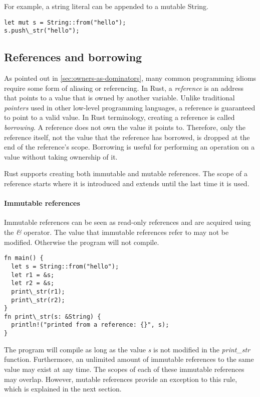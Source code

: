 \documentclass[sigplan,11pt,nonacm]{acmart}
\begin{document}
For example, a string literal can be appended to a mutable String.
\begin{lstlisting}
let mut s = String::from("hello");
s.push\_str("hello");
\end{lstlisting}


\subsection{References and borrowing}
\label{sec:rust-references}

As pointed out in \ref{sec:owners-as-dominators}, many common programming idioms require some form of aliasing or referencing.
In Rust, a \emph{reference} is an address that points to a value that is owned by another variable.
Unlike traditional \emph{pointers} used in other low-level programming languages, a reference is guaranteed to point to a valid value.
In Rust terminology, creating a reference is called \emph{borrowing}.
A reference does not own the value it points to.
Therefore, only the reference itself, not the value that the reference has borrowed, is dropped at the end of the reference's scope.
Borrowing is useful for performing an operation on a value without taking ownership of it.

Rust supports creating both immutable and mutable references.
The scope of a reference starts where it is introduced and extends until the last time it is used.

\paragraph{Immutable references}

Immutable references can be seen as read-only references and are acquired using the \emph{\&} operator.
The value that immutable references refer to may not be modified.
Otherwise the program will not compile.

\begin{lstlisting}
fn main() {
  let s = String::from("hello");
  let r1 = &s;
  let r2 = &s;
  print\_str(r1);
  print\_str(r2);
}
fn print\_str(s: &String) {
  println!("printed from a reference: {}", s);
}
\end{lstlisting}

The program will compile as long as the value \emph{s} is not modified in the \emph{print\_str} function.
Furthermore, an unlimited amount of immutable references to the same value may exist at any time.
The scopes of each of these immutable references may overlap.
However, mutable references provide an exception to this rule, which is explained in the next section.
\end{document}

